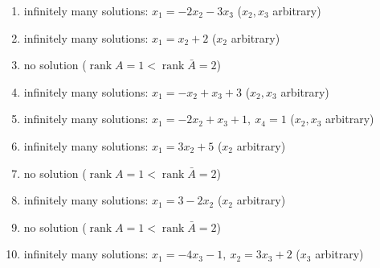 \begin{enumerate}[label=\arabic*., leftmargin=*, itemsep=1pt]
\item infinitely many solutions: $x_1=- 2 x_{2} - 3 x_{3}$ ($x_{2}, x_{3}$ arbitrary)
\item infinitely many solutions: $x_1=x_{2} + 2$ ($x_{2}$ arbitrary)
\item no solution ($\operatorname{rank}A=1<\operatorname{rank}\bar A=2$)
\item infinitely many solutions: $x_1=- x_{2} + x_{3} + 3$ ($x_{2}, x_{3}$ arbitrary)
\item infinitely many solutions: $x_1=- 2 x_{2} + x_{3} + 1,\ x_4=1$ ($x_{2}, x_{3}$ arbitrary)
\item infinitely many solutions: $x_1=3 x_{2} + 5$ ($x_{2}$ arbitrary)
\item no solution ($\operatorname{rank}A=1<\operatorname{rank}\bar A=2$)
\item infinitely many solutions: $x_1=3 - 2 x_{2}$ ($x_{2}$ arbitrary)
\item no solution ($\operatorname{rank}A=1<\operatorname{rank}\bar A=2$)
\item infinitely many solutions: $x_1=- 4 x_{3} - 1,\ x_2=3 x_{3} + 2$ ($x_{3}$ arbitrary)
\end{enumerate}
